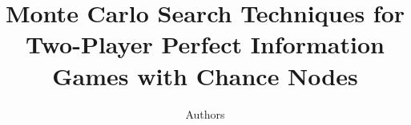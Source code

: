 \documentclass[jair,twoside,11pt,theapa]{article}
\begin{document}
\title{Monte Carlo Search Techniques for Two-Player Perfect Information Games with Chance Nodes}

\author{Authors}



%
%
%
\end{document}
